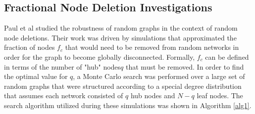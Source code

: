 \documentclass[doc]{apa}%
\begin{document}

\subsection{Fractional Node Deletion Investigations} 
Paul et al studied the robustness of random graphs in the context of random node deletions. Their work was driven by simulations that approximated the fraction of nodes $f_c$ that would need to be removed from random networks in order for the graph to become globally disconnected. Formally, $f_c$ can be defined in terms of the number of "hub" nodes$q$ that must be removed. In order to find the optimal value for $q$, a Monte Carlo search was performed over a large set of random graphs that were structured according to a special degree distribution that assumes each network consisted of $q$ hub nodes and $N - q$ leaf nodes. The search algorithm utilized during these simulations was shown in Algorithm \ref{alg1}. 
\end{document}
